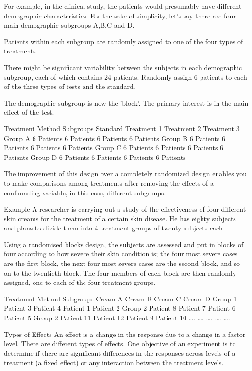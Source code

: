 For example, in the clinical study, the patients would presumably have different demographic characteristics. For the sake of simplicity, let’s say there are four main demographic subgroups A,B,C and D. 

Patients within each subgroup are randomly assigned to one of the four types of treatments. 

There might be significant variability between the subjects in each demographic subgroup, each of which contains 24 patients. Randomly assign 6 patients to each of the three types of tests and the standard. 

The demographic subgroup is now the 'block'. The primary interest is in the main effect of the test.

	Treatment Method
Subgroups	Standard	Treatment 1	Treatment 2	Treatment 3
Group A	6 Patients	6 Patients	6 Patients	6 Patients
Group B	6 Patients	6 Patients	6 Patients	6 Patients
Group C	6 Patients	6 Patients	6 Patients	6 Patients
Group D	6 Patients	6 Patients	6 Patients	6 Patients

The improvement of this design over a completely randomized design enables you to make comparisons among treatments after removing the effects of a confounding variable, in this case, different subgroups.

Example 
A researcher is carrying out a study of the effectiveness of four different skin creams for the treatment of a certain skin disease. He has eighty subjects and plans to divide them into 4 treatment groups of twenty subjects each. 

Using a randomised blocks design, the subjects are assessed and put in blocks of four according to how severe their skin condition is; the four most severe cases are the first block, the next four most severe cases are the second block, and so on to the twentieth block. The four members of each block are then randomly assigned, one to each of the four treatment groups.

	Treatment Method
Subgroups	Cream A	Cream B	Cream C	Cream D
Group 1	Patient 3	Patient 4	Patient 1	Patient 2
Group 2	 Patient 8	Patient 7	Patient 6	Patient 5
Group 2	Patient 11	Patient 12	 Patient 9	Patient 10
….	….	….	….	….

Types of Effects
An effect is a change in the response due to a change in a factor level. There are different types of effects. One objective of an experiment is to determine if there are significant differences in the responses across levels of a treatment (a fixed effect) or any interaction between the treatment levels. 

